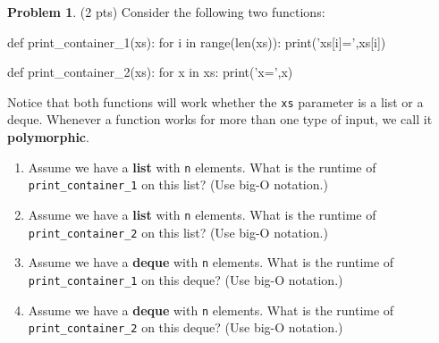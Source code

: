 \documentclass[12pt]{article}
\theoremstyle{definition}
\newtheorem{problem}{Problem}
\begin{document}
\newpage
\begin{problem}
(2 pts)
Consider the following two functions:
\begin{python}
def print_container_1(xs):
    for i in range(len(xs)):
        print('xs[i]=',xs[i])

def print_container_2(xs):
    for x in xs:
        print('x=',x)
\end{python}
Notice that both functions will work whether the \texttt{xs} parameter is a list or a deque.
Whenever a function works for more than one type of input, we call it \textbf{polymorphic}.
\begin{enumerate}
    \item 
        Assume we have a \textbf{list} with \texttt{n} elements.
        What is the runtime of \texttt{print\_container\_1} on this list?
        (Use big-O notation.)
        \vspace{1in}
    \item 
        Assume we have a \textbf{list} with \texttt{n} elements.
        What is the runtime of \texttt{print\_container\_2} on this list?
        (Use big-O notation.)
        \vspace{1in}
    \item 
        Assume we have a \textbf{deque} with \texttt{n} elements.
        What is the runtime of \texttt{print\_container\_1} on this deque?
        (Use big-O notation.)
        \vspace{1in}
    \item 
        Assume we have a \textbf{deque} with \texttt{n} elements.
        What is the runtime of \texttt{print\_container\_2} on this deque?
        (Use big-O notation.)
        \vspace{1in}
\end{enumerate}
\end{problem}
\end{document}
